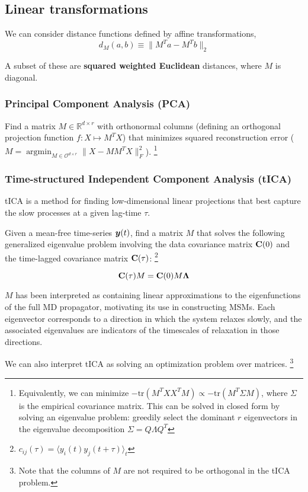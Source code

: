 \documentclass[aps,prl,preprint,nofootinbib,superscriptaddress,linenumbers]{revtex4-1}
\newcommand{\bfv}[1]{{\mbox{\boldmath{$#1$}}}}
\newcommand{\bfm}[1]{{\bf #1}}
\DeclareMathOperator*{\argmin}{argmin}
\newcommand{\bemph}[1]{\textbf{#1}}
\begin{document}
\subsection{Linear transformations}
We can consider distance functions defined by affine transformations, $$d_M(a,b) \equiv \| M^T a - M^T b \|_2 $$

A subset of these are \bemph{squared weighted Euclidean} distances, where $M$ is diagonal.

\subsubsection{Principal Component Analysis (PCA)}
Find a matrix $M\in \mathbb{R}^{d \times r}$ with orthonormal columns (defining an orthogonal projection function $f:X\mapsto M^T X$) that minimizes squared reconstruction error ($M = \argmin_{M \in \mathcal{O}^{d \times r}} \|X-MM^TX\|^2_F$).
\footnote{Equivalently, we can minimize $-\text{tr}(M^T X X^T M) \propto -\text{tr}(M^T \Sigma M)$, where $\Sigma$ is the empirical covariance matrix. This can be solved in closed form by solving an eigenvalue problem: greedily select the dominant $r$ eigenvectors in the eigenvalue decomposition $\Sigma = Q \Lambda Q^T$}

\subsubsection{Time-structured Independent Component Analysis (tICA)}
tICA is a method for finding low-dimensional linear projections that best capture the slow processes at a given lag-time $\tau$.

Given a mean-free time-series $\bfv{y}(t)$, find a matrix $M$ that solves the following generalized eigenvalue problem involving the data covariance matrix $\bfm{C}(0)$ and the time-lagged covariance matrix $\bfm{C}(\tau)$:
\footnote{$c_{ij}(\tau) = \langle y_i(t) y_j(t+\tau)\rangle_t$}

$$\bfm{C}(\tau) M = \bfm{C}(0) M \bfm{\Lambda}$$

$M$ has been interpreted as containing linear approximations to the eigenfunctions of the full MD propagator, motivating its use in constructing MSMs. Each eigenvector corresponds to a direction in which the system relaxes slowly, and the associated eigenvalues are indicators of the timescales of relaxation in those directions.

We can also interpret tICA as solving an optimization problem over matrices. \footnote{Note that the columns of $M$ are not required to be orthogonal in the tICA problem.}
\end{document}

